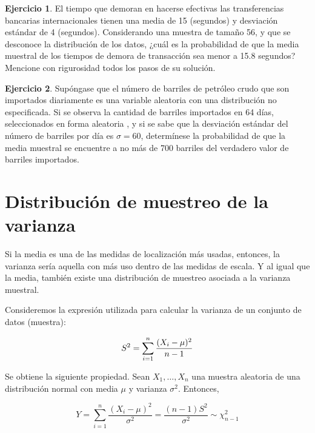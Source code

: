 \documentclass[
  11pt,
]{book}
\theoremstyle{definition}
\theoremstyle{definition}
\theoremstyle{definition}
\newtheorem{exercise}{Ejercicio}[chapter]
\theoremstyle{definition}
\theoremstyle{remark}
\begin{document}
\begin{exercise}
El tiempo que demoran en hacerse efectivas las transferencias bancarias internacionales tienen una media de 15 (segundos) y desviación estándar de 4 (segundos). Considerando una muestra de tamaño 56, y que se desconoce la distribución de los datos, ¿cuál es la probabilidad de que la media muestral de los tiempos de demora de transacción sea menor a 15.8 segundos? Mencione con rigurosidad todos los pasos de su solución.
\end{exercise}

\begin{exercise}
Supóngase que el número de barriles de petróleo crudo que son importados diariamente es una variable aleatoria con una distribución no especificada. Si se observa la cantidad de barriles importados en 64 días, seleccionados en forma aleatoria , y si se sabe que la desviación estándar del número de barriles por día es \(\sigma = 60\), determínese la probabilidad de que la media muestral se encuentre a no más de 700 barriles del verdadero valor de barriles importados.
\end{exercise}

\section{Distribución de muestreo de la varianza}\label{distribuciuxf3n-de-muestreo-de-la-varianza}

Si la media es una de las medidas de localización más usadas, entonces, la varianza sería aquella con más uso dentro de las medidas de escala. Y al igual que la media, también existe una distribución de muestreo asociada a la varianza muestral.

Consideremos la expresión utilizada para calcular la varianza de un conjunto de datos (muestra):

\begin{equation}
\notag
S^2 = \sum_{i=1}^n\frac{(X_i-\mu)^2}{n-1}
\end{equation}

Se obtiene la siguiente propiedad. Sean \(X_1,\ldots,X_n\) una muestra aleatoria de una distribución normal con media \(\mu\) y varianza \(\sigma^2\). Entonces,

\begin{equation}
Y=\sum_{i=1}^n\frac{(X_i-\mu)^2}{\sigma^2} = \frac{(n-1)S^2}{\sigma^2} \sim \chi^2_{n-1}
\label{eq:distVar}
\end{equation}
\end{document}
